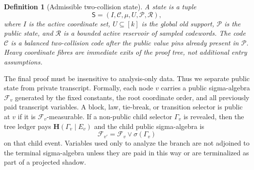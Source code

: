 \documentclass[11pt]{article}
\newtheorem{definition}[theorem]{Definition}
\newcommand{\C}{\mathcal C}
\newcommand{\bfH}{\mathbf H}
\begin{document}
\begin{definition}[Admissible two-collision state]
A state is a tuple
\[
  \mathsf S=(I,\C,\mu,U,\mathcal P,\mathcal R),
\]
where $I$ is the active coordinate set, $U\subseteq [k]$ is the global old
support,
$\mathcal P$ is the public state, and $\mathcal R$ is a bounded active
reservoir of sampled codewords.  The code $\C$ is a balanced two-collision
code after the public value pins already present in $\mathcal P$.  Heavy
coordinate fibres are immediate exits of the proof tree, not additional
entry assumptions.
\end{definition}

The final proof must be insensitive to analysis-only data.  Thus we separate
public state from private transcript.  Formally, each node $v$ carries a
public sigma-algebra $\mathcal F_v$ generated by the fixed constants, the root
coordinate order, and all previously paid transcript variables.  A block,
law, tie-break, or transition selector is public at $v$ if it is
$\mathcal F_v$-measurable.  If a non-public child selector $\Gamma_v$ is
revealed, then the tree ledger pays $\bfH(\Gamma_v\mid E_v)$ and the child
public sigma-algebra is
\[
  \mathcal F_{v'}=\mathcal F_v\vee \sigma(\Gamma_v)
\]
on that child event.  Variables used only to analyze the branch are not
adjoined to the terminal sigma-algebra unless they are paid in this way or
are terminalized as part of a projected shadow.
\end{document}
